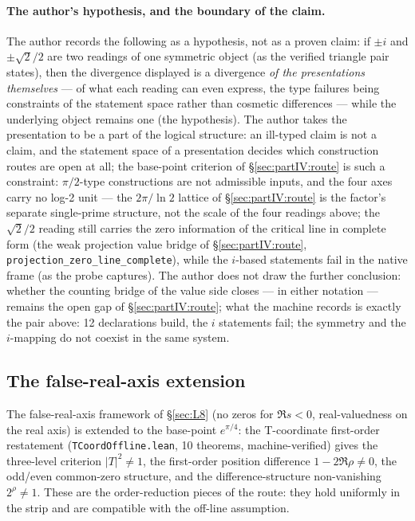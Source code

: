 \documentclass{article}
\begin{document}
\paragraph{The author's hypothesis, and the boundary of the claim.}
The author records the following as a hypothesis, not as a proven
claim: if $\pm i$ and $\pm\sqrt2/2$ are two readings of one symmetric
object (as the verified triangle pair states), then the divergence
displayed is a divergence \emph{of the presentations themselves} ---
of what each reading can even express, the type failures being
constraints of the statement space rather than cosmetic differences
--- while the underlying object remains one (the hypothesis). The
author takes the presentation to be a part of the logical structure:
an ill-typed claim is not a claim, and the statement space of a
presentation decides which construction routes are open at all; the
base-point criterion of \S\ref{sec:partIV:route} is such a
constraint: $\pi/2$-type constructions are not admissible inputs, and
the four axes carry no log-2 unit --- the $2\pi/\ln 2$ lattice of
\S\ref{sec:partIV:route} is the factor's separate single-prime
structure, not the scale of the four readings above; the
$\sqrt2/2$ reading still carries the
zero information of the critical
line in complete form (the weak projection value bridge of
\S\ref{sec:partIV:route}, \texttt{projection\_zero\_line\_complete}),
while the $i$-based statements fail in the native frame (as the probe
captures). The author does not
draw the further conclusion: whether the counting bridge of the value
side closes --- in either notation --- remains the open gap of
\S\ref{sec:partIV:route}; what the machine records is exactly the
pair above: 12 declarations build, the $i$ statements fail; the
symmetry and the $i$-mapping do not coexist in the same system.

\subsection{The false-real-axis extension}
\label{sec:partIV:fra}

The false-real-axis framework of \S\ref{sec:L8} (no zeros for
$\Re s<0$, real-valuedness on the real axis) is extended to the
base-point $e^{\pi/4}$: the T-coordinate first-order restatement
(\texttt{TCoordOffline.lean}, 10 theorems, machine-verified) gives the
three-level criterion $|T|^2\ne 1$, the first-order position difference
$1-2\Re\rho\ne 0$, the odd/even common-zero structure, and the
difference-structure non-vanishing $2^\rho\ne 1$. These are the
order-reduction pieces of the route: they hold uniformly in the strip
and are compatible with the off-line assumption.
\end{document}
